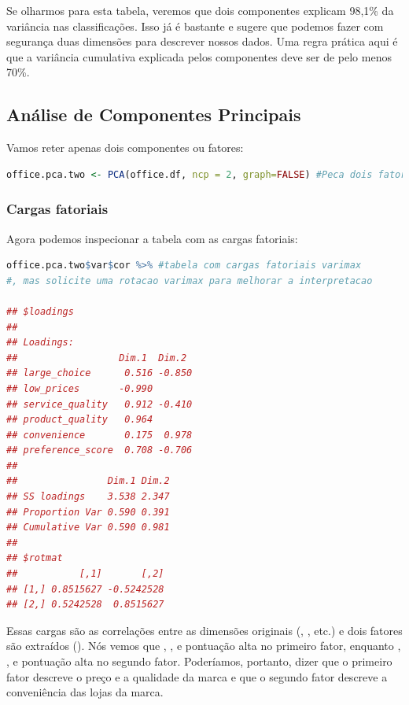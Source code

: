 \documentclass{article}
\begin{document}
Se olharmos para esta tabela, veremos que dois componentes explicam 98,1\% da variância nas classificações. Isso já é bastante e sugere que podemos fazer com segurança duas dimensões para descrever nossos dados. Uma regra prática aqui é que a variância cumulativa explicada pelos componentes deve ser de pelo menos 70\%.

\subsection{Análise de Componentes Principais}

Vamos reter apenas dois componentes ou fatores:

\begin{lstlisting}[language=R]
office.pca.two <- PCA(office.df, ncp = 2, graph=FALSE) #Peca dois fatores preenchendo o argumento ncp.
\end{lstlisting}

\subsubsection{Cargas fatoriais}

Agora podemos inspecionar a tabela com as cargas fatoriais:

\begin{lstlisting}[language=R]
office.pca.two$var$cor %>% #tabela com cargas fatoriais varimax 
#, mas solicite uma rotacao varimax para melhorar a interpretacao

## $loadings
## 
## Loadings:
##                  Dim.1  Dim.2 
## large_choice      0.516 -0.850
## low_prices       -0.990       
## service_quality   0.912 -0.410
## product_quality   0.964       
## convenience       0.175  0.978
## preference_score  0.708 -0.706
## 
##                Dim.1 Dim.2
## SS loadings    3.538 2.347
## Proportion Var 0.590 0.391
## Cumulative Var 0.590 0.981
## 
## $rotmat
##           [,1]       [,2]
## [1,] 0.8515627 -0.5242528
## [2,] 0.5242528  0.8515627
\end{lstlisting}


Essas cargas são as correlações entre as dimensões originais  (, , etc.) e dois fatores são extraídos (). Nós vemos que , , e  pontuação alta no primeiro fator, enquanto , , e  pontuação alta no segundo fator. Poderíamos, portanto, dizer que o primeiro fator descreve o preço e a qualidade da marca e que o segundo fator descreve a conveniência das lojas da marca.
\end{document}
